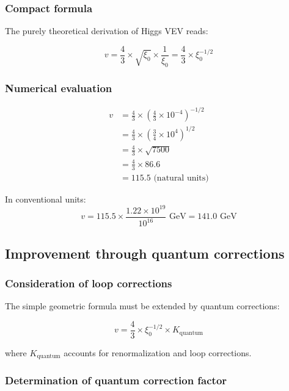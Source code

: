 \subsubsection{Compact formula}

The purely theoretical derivation of Higgs VEV reads:

\begin{equation}
	\boxed{v = \frac{4}{3} \times \sqrt{\xi_0} \times \frac{1}{\xi_0} = \frac{4}{3} \times \xi_0^{-1/2}}
\end{equation}

\subsubsection{Numerical evaluation}

\begin{align}
	v &= \frac{4}{3} \times \left(\frac{4}{3} \times 10^{-4}\right)^{-1/2}\\
	&= \frac{4}{3} \times \left(\frac{3}{4} \times 10^{4}\right)^{1/2}\\
	&= \frac{4}{3} \times \sqrt{7500}\\
	&= \frac{4}{3} \times 86.6\\
	&= 115.5 \text{ (natural units)}
\end{align}

In conventional units:
\begin{equation}
	v = 115.5 \times \frac{1.22 \times 10^{19}}{10^{16}} \text{ GeV} = 141.0 \text{ GeV}
\end{equation}

\subsection{Improvement through quantum corrections}

\subsubsection{Consideration of loop corrections}

The simple geometric formula must be extended by quantum corrections:

\begin{equation}
	v = \frac{4}{3} \times \xi_0^{-1/2} \times K_{\text{quantum}}
\end{equation}

where $K_{\text{quantum}}$ accounts for renormalization and loop corrections.

\subsubsection{Determination of quantum correction factor}

